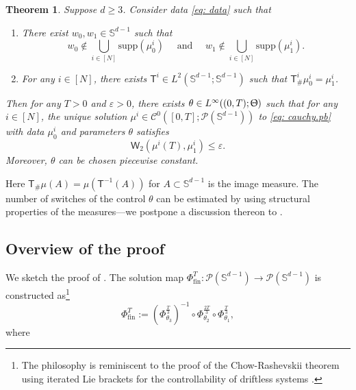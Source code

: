 \documentclass[a4paper,11pt]{article}
\theoremstyle{plain}
\newtheorem{theorem}{Theorem}[section]
\newcommand{\supp}{\mathrm{supp}}
\renewcommand{\S}{\mathbb{S}^{d-1}}
\renewcommand{\leq}{\leqslant}
\renewcommand{\geq}{\geqslant}
\renewcommand{\sec}{\textsection}
\numberwithin{equation}{section}
\begin{document}
\begin{theorem} \label{thm: main.result}
Suppose $d\geq3$. Consider data \eqref{eq: data} such that
\begin{enumerate}
    \item There exist $w_0,w_1\in\S$ such that 
    \begin{equation} \label{eq: assumption.hole}
        w_0\notin\bigcup_{i\in[N]} \supp(\mu_0^i) \quad \text{ and } \quad w_1\notin\bigcup_{i\in[N]}\supp(\mu_1^i). 
    \end{equation}  
    \item For any $i\in[N]$, there exists $\mathsf{T}^i\in L^2(\S;\S)$ such that $\mathsf{T}^i_{\#}\mu_0^i=\mu_1^i$.
\end{enumerate}
Then for any $T>0$ and $\varepsilon>0$, there exists $\theta\in L^\infty((0,T);\Uptheta)$ such that for any $i\in[N]$, the unique solution $\mu^i\in\mathscr{C}^0([0,T];\mathscr{P}(\S))$ to \eqref{eq: cauchy.pb} with data $\mu_0^i$ and parameters $\theta$ satisfies
    \begin{equation*}
        \mathsf{W}_2\left(\mu^i(T),\mu_1^i\right)\leq\varepsilon.
    \end{equation*}
    Moreover, $\theta$ can be chosen piecewise constant.
\end{theorem}

Here $\mathsf{T}_{\#}\mu(A) = \mu(\mathsf{T}^{-1}(A))$ for $A\subset\S$ is the image measure. The number of switches of the control $\theta$ can be estimated by using structural properties of the measures---we postpone a discussion thereon to {\bf {}}.

\subsection{Overview of the proof} \label{sec: sketch}

We sketch the proof of .
The solution map $\Phi_{\text{fin}}^T:\mathscr{P}(\S)\to\mathscr{P}(\S)$ is constructed as\footnote{The philosophy is reminiscent to the proof of the Chow-Rashevskii theorem using iterated Lie brackets for the controllability of driftless systems \cite[\sec 3.3]{coron2007control}.}
$$\Phi_{\text{fin}}^T:=\left(\Phi_{\theta_3}^{\frac{T}{3}}\right)^{-1}\circ\Phi_{\theta_2}^{\frac{2T}{3}}\circ\Phi_{\theta_1}^{\frac{T}{3}},$$ where
\end{document}
